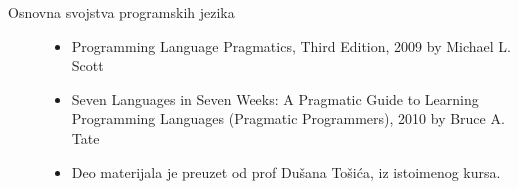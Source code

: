 \documentclass[main.tex]{subfiles}
\begin{document}
\begin{description}
\item[Osnovna svojstva programskih jezika]\hfill
\begin{itemize}
\item Programming Language Pragmatics, Third Edition, 2009 by Michael L. Scott
\item Seven Languages in Seven Weeks: A Pragmatic Guide to Learning Programming Languages (Pragmatic Programmers), 2010 by Bruce A. Tate
\item Deo materijala je preuzet od prof Dušana Tošića, iz istoimenog kursa.
\end{itemize}
\end{description}
\end{document}
